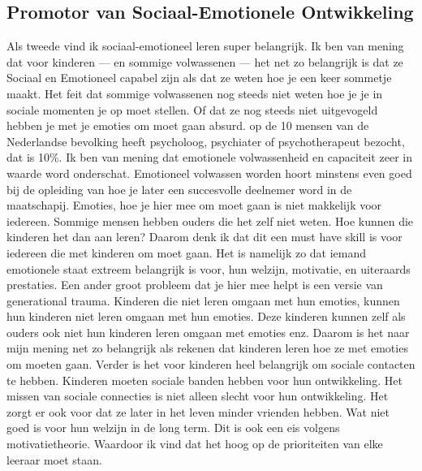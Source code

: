 \documentclass{article}
\begin{document}
        \subsection{Promotor van Sociaal-Emotionele Ontwikkeling}
            Als tweede vind ik sociaal-emotioneel leren super belangrijk. Ik ben van mening dat voor kinderen — en sommige volwassenen — het net zo belangrijk is dat ze Sociaal en Emotioneel capabel zijn als dat ze weten hoe je een keer sommetje maakt. Het feit dat sommige volwassenen nog steeds niet weten hoe je je in sociale momenten je op moet stellen. Of dat ze nog steeds niet uitgevogeld hebben je met je emoties om moet gaan absurd.
            \bigskip
             op de 10 mensen van de Nederlandse bevolking heeft psycholoog, psychiater of psychotherapeut bezocht, dat is 10\%.\cite{1-in-10-pygy} Ik ben van mening dat emotionele volwassenheid en capaciteit zeer in waarde word onderschat. Emotioneel volwassen worden hoort minstens even goed bij de opleiding van hoe je later een succesvolle deelnemer word in de maatschapij.
            \bigskip
            \noindent Emoties, hoe je hier mee om moet gaan is niet makkelijk voor iedereen. Sommige mensen hebben ouders die het zelf niet weten. Hoe kunnen die kinderen het dan aan leren? Daarom denk ik dat dit een must have skill is voor iedereen die met kinderen om moet gaan. Het is namelijk zo dat iemand emotionele staat extreem belangrijk is voor, hun welzijn, motivatie, en uiteraards prestaties. 
            \bigskip
            \noindent Een ander groot probleem dat je hier mee helpt is een versie van generational trauma. Kinderen die niet leren omgaan met hun emoties, kunnen hun kinderen niet leren omgaan met hun emoties. Deze kinderen kunnen zelf als ouders ook niet hun kinderen leren omgaan met emoties enz. Daarom is het naar mijn mening net zo belangrijk als rekenen dat kinderen leren hoe ze met emoties om moeten gaan.
            \bigskip
            \noindent Verder is het voor kinderen heel belangrijk om sociale contacten te hebben. Kinderen moeten sociale banden hebben voor hun ontwikkeling.\cite{social-isolation-affect-a-childs-mental-health-and-development} Het missen van sociale connecties is niet alleen slecht voor hun ontwikkeling. Het zorgt er ook voor dat ze later in het leven minder vrienden hebben. Wat niet goed is voor hun welzijn in de long term. Dit is ook een eis volgens motivatietheorie. Waardoor ik vind dat het hoog op de prioriteiten van elke leeraar moet staan.

    \newpage
    
\end{document}
